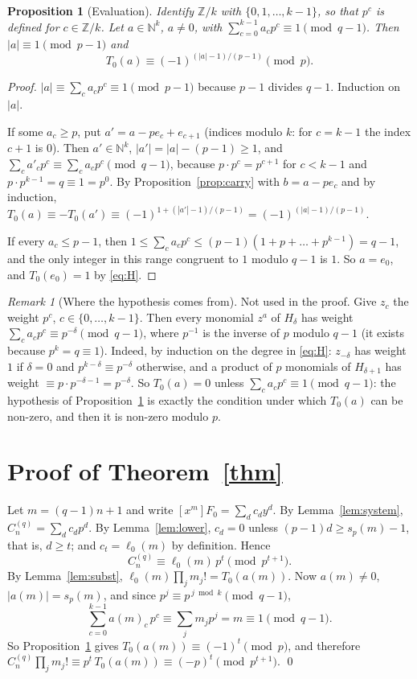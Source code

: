 \documentclass[11pt]{article}
\newtheorem{proposition}[theorem]{Proposition}
\theoremstyle{definition}
\theoremstyle{remark}
\newtheorem{remark}[theorem]{Remark}
\newcommand{\Z}{\mathbb Z}
\newcommand{\N}{\mathbb N}
\newcommand{\C}{C_n^{(q)}}
\begin{document}
\begin{proposition}[Evaluation]\label{prop:eval}
Identify $\Z/k$ with $\{0,1,\dots,k-1\}$, so that $p^c$ is defined for $c\in\Z/k$.
Let $a\in\N^k$, $a\ne0$, with $\sum_{c=0}^{k-1}a_cp^c\equiv1\pmod{q-1}$. Then
$|a|\equiv1\pmod{p-1}$ and
\[
 T_0(a)\equiv(-1)^{(|a|-1)/(p-1)}\pmod p .
\]
\end{proposition}

\begin{proof}
$|a|\equiv\sum_ca_cp^c\equiv1\pmod{p-1}$ because $p-1$ divides $q-1$. Induction on $|a|$.

If some $a_c\ge p$, put $a'=a-pe_c+e_{c+1}$ (indices modulo $k$: for $c=k-1$ the index
$c+1$ is $0$). Then $a'\in\N^k$,
$|a'|=|a|-(p-1)\ge1$, and $\sum_ca'_cp^c\equiv\sum_ca_cp^c\pmod{q-1}$, because
$p\cdot p^c=p^{c+1}$ for $c<k-1$ and $p\cdot p^{k-1}=q\equiv1=p^0$. By
Proposition~\ref{prop:carry} with $b=a-pe_c$ and by induction,
$T_0(a)\equiv-T_0(a')\equiv(-1)^{1+(|a'|-1)/(p-1)}=(-1)^{(|a|-1)/(p-1)}$.

If every $a_c\le p-1$, then $1\le\sum_ca_cp^c\le(p-1)(1+p+\dots+p^{k-1})=q-1$, and the only
integer in this range congruent to $1$ modulo $q-1$ is $1$. So $a=e_0$, and $T_0(e_0)=1$ by
\eqref{eq:H}.
\end{proof}

\begin{remark}[Where the hypothesis comes from]\label{rem:support}
Not used in the proof. Give $z_c$ the weight $p^c$, $c\in\{0,\dots,k-1\}$. Then every monomial
$z^a$ of $H_\delta$ has weight $\sum_ca_cp^c\equiv p^{-\delta}\pmod{q-1}$, where $p^{-1}$ is
the inverse of $p$ modulo $q-1$ (it exists because $p^k=q\equiv1$). Indeed, by induction on
the degree in \eqref{eq:H}: $z_{-\delta}$ has weight $1$ if $\delta=0$ and
$p^{k-\delta}\equiv p^{-\delta}$ otherwise, and a product of $p$ monomials of $H_{\delta+1}$
has weight $\equiv p\cdot p^{-\delta-1}=p^{-\delta}$. So $T_0(a)=0$ unless
$\sum_ca_cp^c\equiv1\pmod{q-1}$: the hypothesis of Proposition~\ref{prop:eval} is exactly
the condition under which $T_0(a)$ can be non-zero, and then it is non-zero modulo $p$.
\end{remark}

\section{Proof of Theorem~\ref{thm}}

Let $m=(q-1)n+1$ and write $[x^m]F_0=\sum_dc_dy^d$. By Lemma~\ref{lem:system},
$\C=\sum_dc_dp^d$. By Lemma~\ref{lem:lower}, $c_d=0$ unless $(p-1)d\ge s_p(m)-1$, that is,
$d\ge t$; and $c_t=\ell_0(m)$ by definition. Hence
\[
 \C\equiv\ell_0(m)\,p^t\pmod{p^{t+1}} .
\]
By Lemma~\ref{lem:subst}, $\ell_0(m)\prod_jm_j!=T_0(a(m))$. Now $a(m)\ne0$,
$|a(m)|=s_p(m)$, and since $p^j\equiv p^{\,j\bmod k}\pmod{q-1}$,
\[
 \sum_{c=0}^{k-1}a(m)_c\,p^c\equiv\sum_jm_jp^j=m\equiv1\pmod{q-1}.
\]
So Proposition~\ref{prop:eval} gives $T_0(a(m))\equiv(-1)^t\pmod p$, and therefore
$\C\prod_jm_j!\equiv p^t\,T_0(a(m))\equiv(-p)^t\pmod{p^{t+1}}$. \qed
\end{document}
